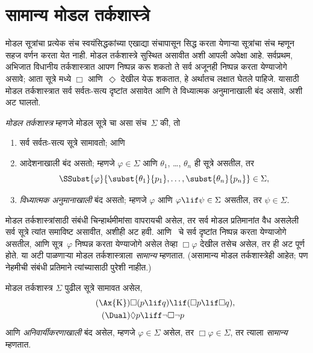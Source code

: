 \section{सामान्य मोडल तर्कशास्त्रे}\label{nml:prf:nor:sec}

मोडल सूत्रांचा प्रत्येक संच स्वयंसिद्धकांच्या
एखाद्या संचापासून सिद्ध करता येणाऱ्या
सूत्रांचा संच म्हणून सहज वर्णन करता येत
नाही. मोडल तर्कशास्त्रे सुस्थित असावीत अशी
आपली अपेक्षा आहे. सर्वप्रथम, अभिजात विधानीय
तर्कशास्त्रात आपण निष्पन्न करू शकतो ते सर्व
अजूनही निष्पन्न करता येण्याजोगे असावे; आता सूत्रे
मध्ये $\Box$
    आणि~$\Diamond$ देखील
येऊ शकतात, हे अर्थातच लक्षात घेतले पाहिजे.
यासाठी मोडल तर्कशास्त्रात सर्व सर्वतः-सत्य दृष्टांत
असावेत आणि ते विध्यात्मक अनुमानाखाली बंद असावे,
अशी अट घालतो.

\begin{defn}
  \emph{मोडल तर्कशास्त्र} म्हणजे मोडल सूत्रे
  चा असा संच~$\Sigma$ की, तो
  \begin{enumerate}
  \item सर्व सर्वतः-सत्य सूत्रे सामावतो; आणि
  \item आदेशनाखाली बंद असतो; म्हणजे $\varphi \in \Sigma$
    आणि $\theta_1$, \dots, $\theta_n$ ही सूत्रे
    असतील, तर
    \[    \SSubst{\varphi}{\subst{\theta_1}{p_1}, \dots, \subst{\theta_n}{p_n}} \in \Sigma,
    \]
    \item \emph{विध्यात्मक अनुमानाखाली} बंद असतो;
    म्हणजे $\varphi$ आणि $\varphi
      \lif \psi \in \Sigma$ असतील, तर $\psi \in \Sigma$.
  \end{enumerate}
\end{defn}

मोडल तर्कशास्त्रांसाठी संबंधी चिन्हार्थमीमांसा
वापरायची असेल, तर सर्व मोडल प्रतिमानांत वैध
असलेली सर्व सूत्रे त्यांत समाविष्ट असावीत,
अशीही अट हवी.  आणि~\Dual{}
चे सर्व दृष्टांत निष्पन्न करता येण्याजोगे असतील, आणि
सूत्र~$\varphi$ निष्पन्न करता येण्याजोगे असेल तेव्हा
$\Box \varphi$ देखील तसेच असेल, तर ही अट पूर्ण होते.
या अटी पाळणाऱ्या मोडल तर्कशास्त्राला
\emph{सामान्य} म्हणतात. (असामान्य मोडल तर्कशास्त्रेही
आहेत; पण नेहमीची संबंधी प्रतिमाने त्यांच्यासाठी
पुरेशी नाहीत.)

\begin{defn}
  मोडल तर्कशास्त्र $\Sigma$ पुढील सूत्रे सामावत असेल,
  \begin{align*}
    \tag{\Ax{K}} & \Box(p \lif q) \lif (\Box p \lif \Box q),
    \\
      \tag{\Dual} & \Diamond p \liff \lnot\Box\lnot p
  \end{align*}
  आणि \emph{अनिवार्यीकरणाखाली} बंद असेल, म्हणजे
  $\varphi \in
  \Sigma$ असेल, तर $\Box \varphi \in \Sigma$,
  तर त्याला \emph{सामान्य} म्हणतात.
\end{defn}

